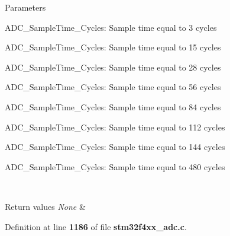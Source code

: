 \begin{DoxyParams}{Parameters}
\begin{DoxyItemize}
\item A\+D\+C\+\_\+\+Sample\+Time\+\_\+Cycles\+: Sample time equal to 3 cycles \item A\+D\+C\+\_\+\+Sample\+Time\+\_\+Cycles\+: Sample time equal to 15 cycles \item A\+D\+C\+\_\+\+Sample\+Time\+\_\+Cycles\+: Sample time equal to 28 cycles \item A\+D\+C\+\_\+\+Sample\+Time\+\_\+Cycles\+: Sample time equal to 56 cycles \item A\+D\+C\+\_\+\+Sample\+Time\+\_\+Cycles\+: Sample time equal to 84 cycles \item A\+D\+C\+\_\+\+Sample\+Time\+\_\+Cycles\+: Sample time equal to 112 cycles \item A\+D\+C\+\_\+\+Sample\+Time\+\_\+Cycles\+: Sample time equal to 144 cycles \item A\+D\+C\+\_\+\+Sample\+Time\+\_\+Cycles\+: Sample time equal to 480 cycles \end{DoxyItemize}
\\
\hline
\end{DoxyParams}

\begin{DoxyRetVals}{Return values}
{\em None} & \\
\hline
\end{DoxyRetVals}


Definition at line \textbf{ 1186} of file \textbf{ stm32f4xx\+\_\+adc.\+c}.


